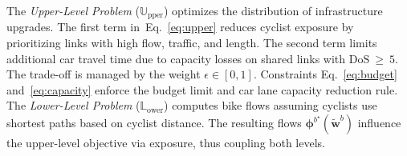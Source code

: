 \documentclass[letterpaper, 10 pt, conference]{ieeeconf}  %
\begin{document}

The \textit{Upper-Level Problem} ($\mathbb{U}_{\text{pper}}$) optimizes the distribution of infrastructure upgrades. The first term in~Eq.~\eqref{eq:upper} reduces cyclist exposure by prioritizing links with high flow, traffic, and length. The second term limits additional car travel time due to capacity losses on shared links with  $\text{DoS}~\geq~5$. The trade-off is managed by the weight $\epsilon \in [0,1]$. Constraints Eq.~\eqref{eq:budget} and~\eqref{eq:capacity} enforce the budget limit and car lane capacity reduction rule.
The \textit{Lower-Level Problem} ($\mathbb{L}_{\text{ower}}$) computes bike flows assuming cyclists use shortest paths based on cyclist distance. The resulting flows $\boldsymbol{\phi}^{b^{\star}}(\tilde{\mathbf{w}}^{b})$ influence the upper-level objective via exposure, thus coupling both levels.
\end{document}
